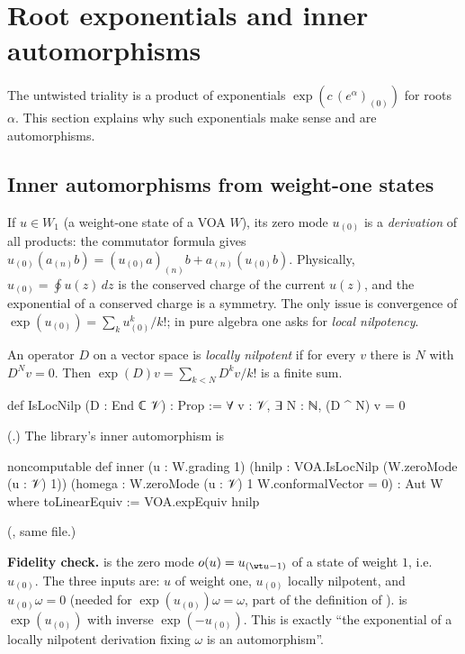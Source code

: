 \section{Root exponentials and inner automorphisms}\label{ch11:sec:rootexp}

The untwisted triality is a product of exponentials $\exp(c\,(e^\alpha)_{(0)})$ for roots $\alpha$.
This section explains why such exponentials make sense and are automorphisms.

\subsection{Inner automorphisms from weight-one states}

If $u\in W_1$ (a weight-one state of a VOA $W$), its zero mode $u_{(0)}$ is a \emph{derivation} of
all products: the commutator formula gives $u_{(0)}(a_{(n)}b)=(u_{(0)}a)_{(n)}b+a_{(n)}(u_{(0)}b)$.
Physically, $u_{(0)}=\oint u(z)\,dz$ is the conserved charge of the current $u(z)$, and the
exponential of a conserved charge is a symmetry.  The only issue is convergence of
$\exp(u_{(0)})=\sum_k u_{(0)}^k/k!$; in pure algebra one asks for \emph{local nilpotency}.

\begin{definition}\label{ch11:def:locnilp}
An operator $D$ on a vector space is \emph{locally nilpotent} if for every $v$ there is $N$ with
$D^Nv=0$.  Then $\exp(D)v=\sum_{k<N}D^kv/k!$ is a finite sum.
\end{definition}
\begin{leancode}
def IsLocNilp (D : End ℂ 𝒱) : Prop := ∀ v : 𝒱, ∃ N : ℕ, (D ^ N) v = 0
\end{leancode}
(.)  The library's inner automorphism is
\begin{leancode}
noncomputable def inner (u : W.grading 1)
    (hnilp : VOA.IsLocNilp (W.zeroMode (u : 𝒱) 1))
    (homega : W.zeroMode (u : 𝒱) 1 W.conformalVector = 0) : Aut W where
  toLinearEquiv := VOA.expEquiv hnilp
\end{leancode}
(, same file.)
\begin{dictionary}
\textbf{Fidelity check.}   is the zero mode $o(u)=u_{(\wt u-1)}$ of a state of
weight $1$, i.e.\ $u_{(0)}$.  The three inputs are: $u$ of weight one, $u_{(0)}$ locally
nilpotent, and $u_{(0)}\omega=0$ (needed for $\exp(u_{(0)})\omega=\omega$, part of the definition of
).   is $\exp(u_{(0)})$ with inverse $\exp(-u_{(0)})$.  This is
exactly ``the exponential of a locally nilpotent derivation fixing $\omega$ is an automorphism''.
\end{dictionary}

